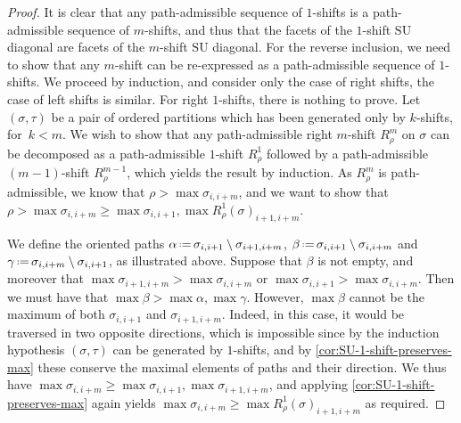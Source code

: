 \documentclass{amsart}
\theoremstyle{definition}
\newcommand{\eqdef}{\mbox{\,\raisebox{0.2ex}{\scriptsize\ensuremath{\mathrm:}}\ensuremath{=}\,}} %
\newcommand{\SU}{\mathrm{SU}}
\begin{document}
\begin{proof}
It is clear that any path-admissible sequence of $1$-shifts is a path-admissible sequence of $m$-shifts, and thus that the facets of the $1$-shift $\SU$ diagonal are facets of the $m$-shift $\SU$ diagonal. 
For the reverse inclusion, we need to show that any $m$-shift can be re-expressed as a path-admissible sequence of $1$-shifts. 
We proceed by induction, and consider only the case of right shifts, the case of left shifts is similar.
For right $1$-shifts, there is nothing to prove.
Let $(\sigma,\tau)$ be a pair of ordered partitions which has been generated only by $k$-shifts, for~$k<m$. 
We wish to show that any path-admissible right $m$-shift $R_\rho^m$ on $\sigma$ can be decomposed as a path-admissible $1$-shift $R_\rho^{1}$ followed by a path-admissible $(m-1)$-shift $R_\rho^{m-1}$, which yields the result by induction.
As $R_\rho^{m}$ is path-admissible, we know that $\rho > \max \sigma_{i,i+m}$, and we want to show that 
$\rho>\max \sigma_{i,i+m}\geq \max \sigma_{i,i+1}, \max R_\rho^{1}(\sigma)_{i+1,i+m}$.
\begin{center}
\end{center}
We define the oriented paths $\alpha \eqdef \sigma_{i,i+1}\setminus \sigma_{i+1,i+m}$, $\beta \eqdef \sigma_{i,i+1}\setminus \sigma_{i,i+m}$ and $\gamma \eqdef \sigma_{i,i+m}\setminus \sigma_{i,i+1}$, as illustrated above. 
Suppose that $\beta$ is not empty, and moreover that $\max\sigma_{i+1,i+m}>\max\sigma_{i,i+m}$ or $\max \sigma_{i,i+1}> \max \sigma_{i,i+m}$.
Then we must have that $\max \beta> \max \alpha, \max \gamma$.
However, $\max\beta$ cannot be the maximum of both $\sigma_{i,i+1}$ and $\sigma_{i+1,i+m}$.
Indeed, in this case, it would be traversed in two opposite directions, which is impossible since by the induction hypothesis $(\sigma,\tau)$ can be generated by $1$-shifts, and by \cref{cor:SU-1-shift-preserves-max} these conserve the maximal elements of paths and their direction.
We thus have $\max \sigma_{i,i+m}\geq \max\sigma_{i,i+1}, \max \sigma_{i+1,i+m}$, and applying \cref{cor:SU-1-shift-preserves-max} again yields $\max \sigma_{i,i+m}\geq \max R_\rho^{1}(\sigma)_{i+1,i+m}$ as required.
\end{proof}
\end{document}
